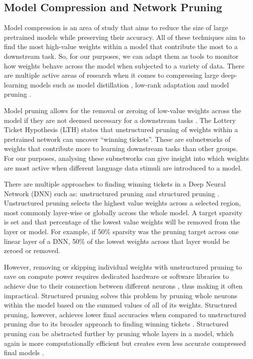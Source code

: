 \subsection{Model Compression and Network Pruning}
Model compression is an area of study that aims to reduce the size of large pretrained models while preserving their accuracy. All of these techniques aim to find the most high-value weights within a model that contribute the most to a downstream task. So, for our purposes, we can adapt them as tools to monitor how weights behave across the model when subjected to a variety of data. There are multiple active areas of research when it comes to compressing large deep-learning models such as model distillation \cite{distillation}, low-rank adaptation \cite{hu2021lora} and model pruning \cite{frankle2018LTH}. 

Model pruning allows for the removal or zeroing of low-value weights across the model if they are not deemed necessary for a downstream tasks \cite{han2015learning}. The Lottery Ticket Hypothesis (LTH) \cite{frankle2018LTH} states that unstructured pruning of weights within a pretrained network can uncover ``winning tickets''. These are subnetworks of weights that contribute more to learning downstream tasks than other groups. For our purposes, analysing these subnetworks can give insight into which weights are most active when different language data stimuli are introduced to a model.

There are multiple approaches to finding winning tickets in a Deep Neural Network (DNN) such as: unstructured pruning \cite{frankle2018LTH} and structured pruning \cite{li2017pruning}. Unstructured pruning selects the highest value weights across a selected region, most commonly layer-wise or globally across the whole model. A target sparsity is set and that percentage of the lowest value weights will be removed from the layer or model. For example, if 50\% sparsity was the pruning target across one linear layer of a DNN, 50\% of the lowest weights across that layer would be zeroed or removed.

However, removing or skipping individual weights with unstructured pruning to save on compute power requires dedicated hardware or software libraries to achieve due to their connection between different neurons \cite{cheng2024survey}, thus making it often impractical. Structured pruning solves this problem by pruning whole neurons within the model based on the summed values of all of its weights. Structured pruning, however, achieves lower final accuracies when compared to unstructured pruning due to its broader approach to finding winning tickets \cite{mao2017exploring, yvinec2021red}. Structured pruning can be abstracted further by pruning whole layers in a model, which again is more computationally efficient but creates even less accurate compressed final models \cite{gromov2024unreasonable}.

